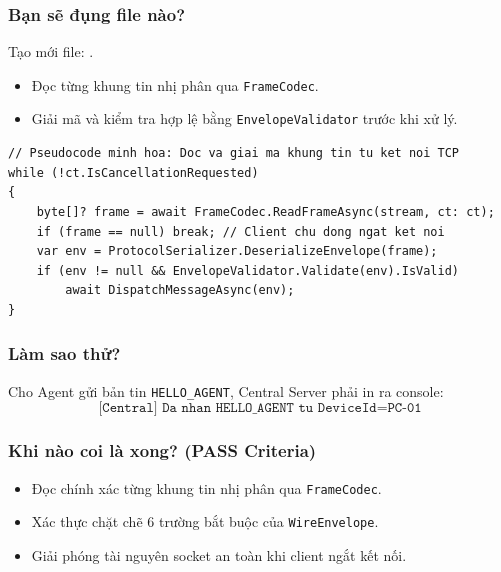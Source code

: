 \documentclass[12pt,a4paper]{article}
\begin{document}
\subsubsection{Bạn sẽ đụng file nào?}
Tạo mới file: .

\begin{orientationbox}
\begin{itemize}[leftmargin=1.5em, itemsep=1pt]
  \item Đọc từng khung tin nhị phân qua \texttt{FrameCodec}.
  \item Giải mã và kiểm tra hợp lệ bằng \texttt{EnvelopeValidator} trước khi xử lý.
\end{itemize}
\end{orientationbox}

\begin{lstlisting}[language=CSharp, caption={Pseudocode minh họa: Vòng lặp đọc và giải mã gói tin}]
// Pseudocode minh hoa: Doc va giai ma khung tin tu ket noi TCP
while (!ct.IsCancellationRequested)
{
    byte[]? frame = await FrameCodec.ReadFrameAsync(stream, ct: ct);
    if (frame == null) break; // Client chu dong ngat ket noi
    var env = ProtocolSerializer.DeserializeEnvelope(frame);
    if (env != null && EnvelopeValidator.Validate(env).IsValid)
        await DispatchMessageAsync(env);
}
\end{lstlisting}

\subsubsection{Làm sao thử?}
Cho Agent gửi bản tin \texttt{HELLO\_AGENT}, Central Server phải in ra console:
$$\texttt{[Central] Da nhan HELLO\_AGENT tu DeviceId=PC-01}$$

\subsubsection{Khi nào coi là xong? (PASS Criteria)}
\begin{itemize}
  \item Đọc chính xác từng khung tin nhị phân qua \texttt{FrameCodec}.
  \item Xác thực chặt chẽ 6 trường bắt buộc của \texttt{WireEnvelope}.
  \item Giải phóng tài nguyên socket an toàn khi client ngắt kết nối.
\end{itemize}

\end{document}
